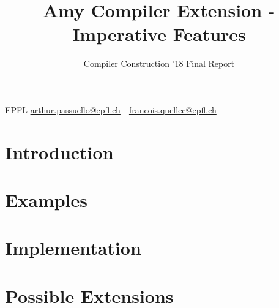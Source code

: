 \documentclass[nocopyrightspace,11pt,authoryear,preprint]{sigplanconf}
\begin{document}

\title{Amy Compiler Extension - Imperative Features}

\subtitle{Compiler Construction '18 Final Report}

           {EPFL}
           {\href{mailto:arthur.passuello@epfl.ch}{arthur.passuello@epfl.ch} - \href{mailto:francois.quellec@epfl.ch}{francois.quellec@epfl.ch}}

\maketitle

\section{Introduction}


\section{Examples}


\section{Implementation}


\section{Possible Extensions}




\end{document}
